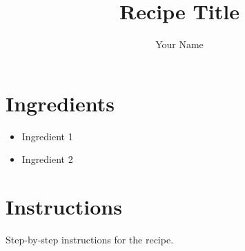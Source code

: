 \documentclass[a4paper,12pt]{article}
\title{Recipe Title}
\author{Your Name}
\date{}
\begin{document}
\maketitle

\section*{Ingredients}
\begin{itemize}
    \item Ingredient 1
    \item Ingredient 2
\end{itemize}

\section*{Instructions}
Step-by-step instructions for the recipe.
\end{document}
